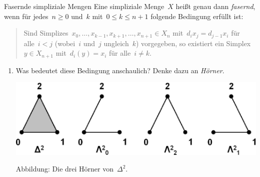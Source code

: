 \documentclass{uebblatt}
\begin{document}
\begin{aufgabe}{Fasernde simpliziale Mengen}
Eine simpliziale Menge~$X$ heißt genau dann \emph{fasernd}, wenn für jedes~$n
\geq 0$ und~$k$ mit~$0 \leq k \leq n + 1$ folgende Bedingung erfüllt ist:
\begin{quote}Sind Simplizes~$x_0,\ldots,x_{k-1},x_{k+1},\ldots,x_{n+1} \in X_n$
mit~$d_i x_j = d_{j-1} x_i$ für alle~$i < j$ (wobei~$i$ und~$j$ ungleich~$k$)
vorgegeben, so existiert ein Simplex~$y \in X_{n+1}$ mit~$d_i(y) = x_i$ für
alle~$i \neq k$.
\end{quote}
\begin{enumerate}
\item Was bedeutet diese Bedingung anschaulich? Denke dazu an \emph{Hörner}.
\begin{center}
\includegraphics[scale=0.5]{hoerner}

Abbildung: Die drei Hörner von~$\Delta^2$.
\end{center}
\end{enumerate}
\end{aufgabe}
\end{document}
